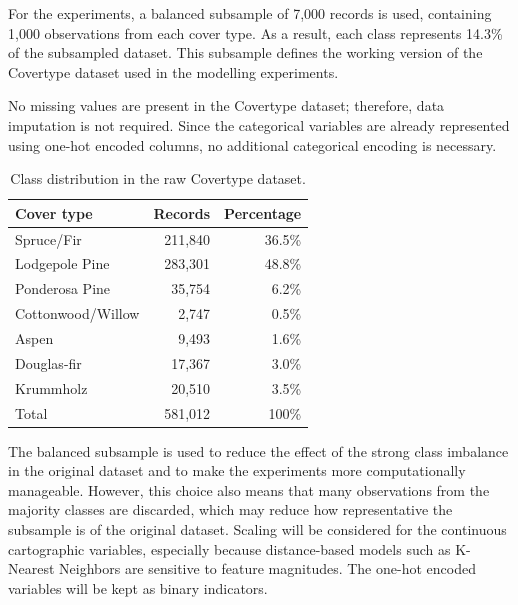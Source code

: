 \documentclass[11pt,a4paper]{article}
\begin{document}
For the experiments, a balanced subsample of 7{,}000 records is used,
containing 1{,}000 observations from each cover type. As a result, each class
represents 14.3\% of the subsampled dataset. This subsample defines the
working version of the Covertype dataset used in the modelling experiments.

No missing values are present in the Covertype dataset; therefore, data
imputation is not required. Since the categorical variables are already
represented using one-hot encoded columns, no additional categorical encoding
is necessary.

\begin{table}[H]
    \centering
    \caption{Class distribution in the raw Covertype dataset.}
    \label{tab:covertype_class_distribution}
    \begin{tabular}{lrr}
        \toprule
        Cover type & Records & Percentage \\
        \midrule
        Spruce/Fir          & 211{,}840 & 36.5\%  \\
        Lodgepole Pine      & 283{,}301 & 48.8\%  \\
        Ponderosa Pine      &  35{,}754 &  6.2\%  \\
        Cottonwood/Willow   &   2{,}747 &  0.5\%  \\
        Aspen               &   9{,}493 &  1.6\%  \\
        Douglas-fir         &  17{,}367 &  3.0\%  \\
        Krummholz           &  20{,}510 &  3.5\%  \\
        \midrule
        Total               & 581{,}012 & 100\%   \\
        \bottomrule
    \end{tabular}
\end{table}

The balanced subsample is used to reduce the effect of the strong class
imbalance in the original dataset and to make the experiments more
computationally manageable. However, this choice also means that many
observations from the majority classes are discarded, which may reduce how
representative the subsample is of the original dataset. Scaling will be
considered for the continuous cartographic variables, especially because
distance-based models such as K-Nearest Neighbors are sensitive to feature
magnitudes. The one-hot encoded variables will be kept as binary indicators.

\end{document}
